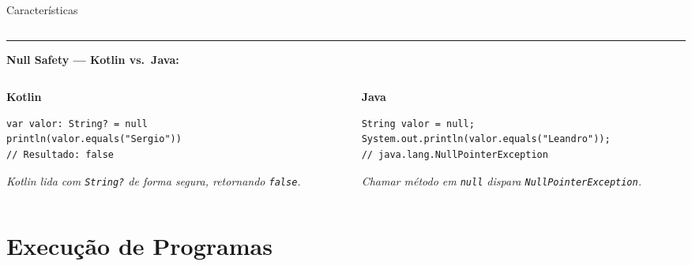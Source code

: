 \documentclass[aspectratio=169]{beamer}
\begin{document}
\begin{frame}[fragile,shrink=5]{Características}
\begin{columns}[T]
  \end{columns}

  \noindent\rule{\textwidth}{0.4pt}
  {\footnotesize\textbf{Null Safety — Kotlin vs.\ Java:}}

  \begin{columns}[T]

    \begin{column}{0.49\textwidth}
      {\footnotesize\textcolor{kotlinpurple}{\textbf{Kotlin}}}
\begin{lstlisting}[style=KotlinStyle]
var valor: String? = null
println(valor.equals("Sergio"))
// Resultado: false
\end{lstlisting}
      {\tiny\textit{Kotlin lida com \texttt{String?} de forma segura, retornando \texttt{false}.}}
    \end{column}

    \begin{column}{0.49\textwidth}
      {\footnotesize\textcolor{kotlinorange}{\textbf{Java}}}
\begin{lstlisting}[style=JavaStyle]
String valor = null;
System.out.println(valor.equals("Leandro"));
// java.lang.NullPointerException
\end{lstlisting}
      {\tiny\textit{Chamar método em \texttt{null} dispara \texttt{NullPointerException}.}}
    \end{column}

  \end{columns}

\end{frame}

\section{Execução de Programas}
\end{document}
